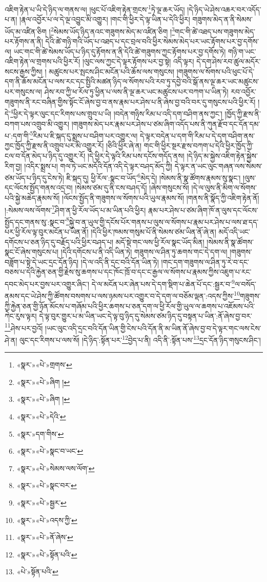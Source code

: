 འཇིག་རྟེན་པ་ཡི་དེ་ཉིད་ལ་གནས་ལ། །ཕུང་པོ་འཇིག་རྟེན་གྲངས་\footnote{«སྣར་»«པེ་»གྲགས་}ཏེ་ལྔ་ཆར་ཡོད། །དེ་ཉིད་ཡེ་ཤེས་འཆར་བར་འདོད་པ་ན། །རྣལ་འབྱོར་པ་ལ་དེ་ལྔ་འབྱུང་མི་འགྱུར། །གང་གི་ཕྱིར་དེ་ལྟ་ཡིན་པ་དེའི་ཕྱིར། གཟུགས་མེད་ན་ནི་སེམས་ཡོད་མ་འཛིན་ཅིག །\footnote{«སྣར་»«པེ་»ཞིག །}སེམས་ཡོད་ཉིད་ནའང་གཟུགས་མེད་མ་འཛིན་ཅིག །\footnote{«སྣར་»«པེ་»ཞིག །}གང་གི་ཚེ་འཐད་པས་གཟུགས་མེད་པར་རྟོགས་ན་ནི། དེའི་ཚེ་གཉི་གའི་ཡོད་པ་འཐད་པ་དང་བྲལ་བའི་ཕྱིར་སེམས་མེད་པར་ཡང་རྟོགས་པར་བྱ་དགོས་ལ། ཡང་གང་གི་ཚེ་སེམས་ཡོད་པ་ཉིད་དུ་རྟོགས་ན་ནི་དེའི་ཚེ་གཟུགས་ཀྱང་རྟོགས་པར་བྱ་དགོས་ཏེ། གཉི་ག་ཡང་འཇིག་རྟེན་ལ་གྲགས་པའི་ཕྱིར་རོ། །ལུང་ལས་ཀྱང་དེ་ལྟར་རྟོགས་པར་བྱ་སྟེ། འདི་ལྟར། དེ་དག་ཤེས་རབ་ཚུལ་མདོར་སངས་རྒྱས་ཀྱིས། །
མཚུངས་པར་སྤངས་ཤིང་མངོན་པའི་ཆོས་ལས་གསུངས། །གཟུགས་ལ་སོགས་པའི་ཕུང་པོ་དེ་དག་ནི་ཆོས་མངོན་པ་ལས་རང་དང་སྤྱིའི་མཚན་ཉིད་ལ་སོགས་པའི་རབ་ཏུ་དབྱེ་བའི་སྒོ་ནས་ལྔ་ཆར་ཡང་མཚུངས་པར་གསུངས་ལ། ཤེས་རབ་ཀྱི་ཕ་རོལ་ཏུ་ཕྱིན་པ་ལས་ནི་ལྔ་ཆར་ཡང་མཚུངས་པར་བཀག་པ་ཡིན་ཏེ། རབ་འབྱོར་གཟུགས་ནི་རང་བཞིན་གྱིས་སྟོང་ངོ་ཞེས་བྱ་བ་ནས་རྣམ་པར་ཤེས་པ་ནི་ཞེས་བྱ་བའི་བར་དུ་གསུངས་པའི་ཕྱིར་རོ། །དེ་\footnote{«སྣར་»«པེ་»དེའི་}ཕྱིར་དེ་ལྟར་ལུང་དང་རིགས་པས་གྲུབ་པ་ཡི། །བདེན་གཉིས་རིམ་པ་འདི་དག་བཤིག་ནས་ཀྱང་། །ཁྱོད་ཀྱི་རྫས་ནི་བཀག་པས་འགྲུབ་མི་འགྱུར། །གཟུགས་མེད་པར་རྣམ་པར་ཤེས་པ་ཙམ་ཞིག་འདོད་པས་ནི་ཀུན་རྫོབ་དང་དོན་དམ་པ་:དག་གི་\footnote{«སྣར་»དག་གིས་}རིམ་པ་ཇི་སྐད་དུ་སྨྲས་པ་བཤིག་པར་འགྱུར་ལ། དེ་ལྟར་བདེན་པ་དག་གི་རིམ་པ་དེ་དག་བཤིག་ནས་ཀྱང་ཁྱོད་ཀྱི་རྫས་ནི་འགྲུབ་པར་མི་འགྱུར་རོ། །ཅིའི་ཕྱིར་ཞེ་ན། གང་གི་ཕྱིར་སྔར་རྫས་བཀག་པ་དེའི་ཕྱིར་ཁྱོད་ཀྱི་ངལ་བ་དོན་མེད་པ་ཉིད་དུ་འགྱུར་རོ། །དེ་ཕྱིར་དེ་ལྟའི་རིམ་པས་དངོས་གདོད་ནས། །དེ་ཉིད་མ་སྐྱེས་འཇིག་རྟེན་སྐྱེས་རིག་བྱ། །འདིར་སྨྲས་པ། གལ་ཏེ་ཡང་མདོའི་དོན་འདི་དེ་ལྟར་བཤད་མོད་ཀྱི། དེ་ལྟར་ན་ཡང་ལུང་གཞན་ལས་སེམས་ཙམ་ཡོད་པ་ཉིད་དུ་ངེས་ཏེ། ཇི་སྐད་དུ། ཕྱི་རོལ་:སྣང་བ་ཡོད་\footnote{«སྣར་»«པེ་»སྣང་བ་ཡང་}མེད་དེ། །སེམས་ནི་སྣ་ཚོགས་རྣམས་སུ་སྣང་། །ལུས་དང་ལོངས་སྤྱོད་གནས་འདྲ་བ། །སེམས་ཙམ་དུ་ནི་ངས་བཤད་དོ། །ཞེས་གསུངས་སོ། །དེ་ལ་ལུས་ནི་མིག་ལ་སོགས་པའི་སྐྱེ་མཆེད་རྣམས་སོ། །ལོངས་སྤྱོད་ནི་གཟུགས་ལ་སོགས་པའི་ཡུལ་རྣམས་སོ། །གནས་ནི་སྣོད་ཀྱི་འཇིག་རྟེན་ནོ། །:སེམས་ལས་ལོགས་\footnote{«སྣར་»«པེ་»སེམས་ལས་ལོག་}ཤིག་ན་ཕྱི་རོལ་ཡོད་པ་མ་ཡིན་པའི་ཕྱིར། རྣམ་པར་ཤེས་པ་ཙམ་ཞིག་ཁོ་ན་ལུས་དང་ལོངས་སྤྱོད་དང་གནས་སུ་:སྣང་བ་\footnote{«སྣར་»«པེ་»སྣང་བར་}སྐྱེ་བ་ན་ཡུལ་གྱི་དངོས་པོར་གནས་པ་ལུས་ལ་སོགས་པ་རྣམ་པར་ཤེས་པ་ལས་ཐ་དད་པར་ཕྱི་རོལ་ལྟ་བུར་མངོན་པ་ཡིན་ནོ། །དེའི་ཕྱིར་ཁམས་གསུམ་པོ་ནི་སེམས་ཙམ་ཡིན་ནོ་ཞེ་ན། མདོ་འདི་ཡང་དགོངས་པ་ཅན་ཉིད་དུ་བརྗོད་པའི་ཕྱིར་བཤད་པ། མདོ་སྡེ་གང་ལས་ཕྱི་རོལ་སྣང་ཡོད་མིན། །སེམས་ནི་སྣ་ཚོགས་སྣང་ངོ་ཞེས་གསུངས་པ། །དེའི་དགོངས་པ་ནི་འདི་ཡིན་ཏེ། གཟུགས་ལ་ཤིན་ཏུ་ཆགས་གང་དེ་དག་ལ། །གཟུགས་བཟློག་པ་སྟེ་དེ་ཡང་དྲང་དོན་ཉིད། །དེ་ལ་འདི་ནི་དྲང་བའི་དོན་ཡིན་ཏེ། །གང་དག་གཟུགས་ལ་ཤིན་ཏུ་རེ་བ་དང་བཅས་པ་དེའི་རྐྱེན་ཅན་གྱི་རྗེས་སུ་ཆགས་པ་དང་ཁོང་ཁྲོ་བ་དང་ང་རྒྱལ་ལ་སོགས་པ་རྣམས་ཀྱིས་འཇུག་པ་རང་དབང་མེད་པར་བྱས་པར་འགྱུར་ཞིང་། དེ་ལ་མངོན་པར་ཞེན་པས་དེ་དག་སྡིག་པ་ཆེན་པོ་དང་:སྦྱར་བ་\footnote{«སྣར་»«པེ་»སྦྱར་}ལ་བསོད་ནམས་དང་ཡེ་ཤེས་ཀྱི་ཚོགས་བསགས་པ་ལས་ཉམས་པར་འགྱུར་བ་དེ་དག་ལ་བཅོམ་ལྡན་:འདས་ཀྱིས་\footnote{«སྣར་»«པེ་»འདས་ཀྱི་}གཟུགས་ཀྱི་རྐྱེན་ཅན་གྱི་ཉོན་མོངས་པ་གཞོམ་པའི་ཕྱིར་ཆགས་པ་ཅན་དག་ལ་ཕྱི་རོལ་གྱི་ཡུལ་ལ་ཆགས་པ་འཇོམས་པའི་ཀེང་རུས་ལྟར། དེ་ལྟ་བུར་གྱུར་པ་མ་ཡིན་ཡང་དེ་ལྟ་བུ་ཉིད་དུ་སེམས་ཙམ་ཉིད་དུ་བསྟན་པ་ཡིན་:ནོ་ཞེས་བྱ་བར་\footnote{«སྣར་»«པེ་»ནོ་ཞེས་}ཤེས་པར་བྱའོ། །ཡང་ལུང་འདི་དྲང་བའི་དོན་ཡིན་གྱི་ངེས་པའི་དོན་ནི་མ་ཡིན་ནོ་ཞེས་བྱ་བ་དེ་ལྟར་གང་ལས་ངེས་ཤེ་ན། ལུང་དང་རིགས་པ་ལས་སོ། །དེ་ཉིད་:སྟོན་པར་\footnote{«སྣར་»«པེ་»སྟོན་པའི་}བྱེད་པ་ནི། འདི་ནི་:སྟོན་པས་\footnote{«པེ་»སྟོན་པའི་}དྲང་དོན་ཉིད་གསུངས་ཤིང་། 